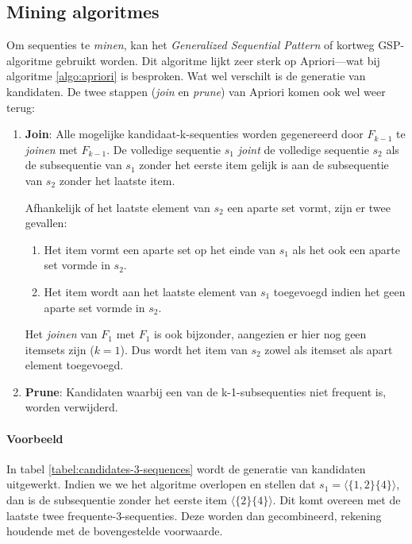 \subsection{Mining algoritmes}
Om sequenties te \emph{minen}, kan het \emph{Generalized Sequential Pattern} of kortweg GSP-algoritme gebruikt worden. Dit algoritme lijkt zeer sterk op Apriori---wat bij algoritme \ref{algo:apriori} is besproken. Wat wel verschilt is de generatie van kandidaten. De twee stappen (\emph{join} en \emph{prune}) van Apriori komen ook wel weer terug:

\begin{enumerate}
\item \textbf{Join}: Alle mogelijke kandidaat-k-sequenties worden gegenereerd door $F_{k-1}$ te \emph{joinen} met $F_{k-1}$. De volledige sequentie $s_1$ \emph{joint} de volledige sequentie $s_2$ als de subsequentie van $s_1$ zonder het eerste item gelijk is aan de subsequentie van $s_2$ zonder het laatste item. 

Afhankelijk of het laatste element van $s_2$ een aparte set vormt, zijn er twee gevallen: 
\begin{enumerate}
\item Het item vormt een aparte set op het einde van $s_1$ als het ook een aparte set vormde in $s_2$.
\item Het item wordt aan het laatste element van $s_1$ toegevoegd indien het geen aparte set vormde in $s_2$.
\end{enumerate}

Het \emph{joinen} van $F_1$ met $F_1$ is ook bijzonder, aangezien er hier nog geen itemsets zijn ($k=1$). Dus wordt het item van $s_2$ zowel als itemset als apart element toegevoegd.
\item \textbf{Prune}: Kandidaten waarbij een van de k-1-subsequenties niet frequent is, worden verwijderd.
\end{enumerate}

\paragraph{Voorbeeld} In tabel \ref{tabel:candidates-3-sequences} wordt de generatie van kandidaten uitgewerkt. Indien we we het algoritme overlopen en stellen dat $s_1 = \langle \{1,2\}\{4\}\rangle $, dan is de subsequentie zonder het eerste item $\langle \{2\}\{4\}\rangle $. Dit komt overeen met de laatste twee frequente-3-sequenties. Deze worden dan gecombineerd, rekening houdende met de bovengestelde voorwaarde. 

